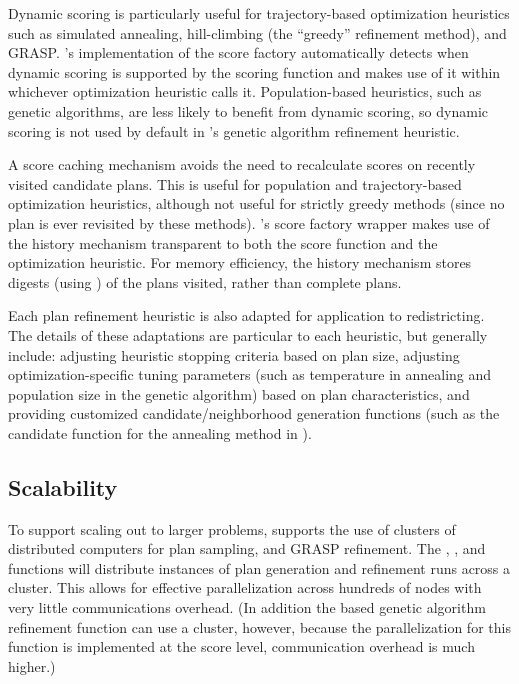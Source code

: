 \documentclass[article]{JSSstyle/jss}
\begin{document}
Dynamic scoring is particularly useful for trajectory-based optimization heuristics such as 
simulated annealing, hill-climbing (the ``greedy'' refinement method), and GRASP. 's implementation 
of the score factory automatically detects when dynamic scoring is supported by the scoring function and makes use of 
it within whichever optimization heuristic calls it. Population-based heuristics, such as 
genetic algorithms, are less likely to benefit from dynamic scoring, so dynamic scoring is not used by 
default in 's genetic algorithm refinement heuristic.

A score caching mechanism avoids the need to recalculate scores on recently visited candidate plans. This is 
useful for population and trajectory-based optimization heuristics, although not useful for 
strictly greedy methods (since no plan is ever revisited by these methods). 's score 
factory wrapper makes use of the history mechanism transparent to both the score function 
and the optimization heuristic. For memory efficiency, the history mechanism stores 
digests (using  \citet{Eddelbuettel07}) of the plans visited, rather than complete plans.

Each plan refinement heuristic is also adapted for application to redistricting. The details of 
these adaptations are particular to each heuristic, but generally include: adjusting heuristic 
stopping criteria based on plan size, adjusting optimization-specific tuning parameters (such as 
temperature in annealing and population size in the genetic algorithm) based on plan characteristics, 
and providing customized candidate/neighborhood generation functions (such as the candidate function 
for the annealing method in ).

\subsection{Scalability}

To support scaling out to larger problems,  supports the use of clusters of distributed 
computers for plan sampling, and GRASP refinement. The , , and  
functions will distribute instances of plan generation and refinement runs across a cluster. This allows for effective 
parallelization across hundreds of nodes with very little communications overhead. (In addition the  based genetic 
algorithm refinement function can use a cluster, however, because the parallelization for this function 
is implemented at the score level, communication overhead is much higher.)
\end{document}
